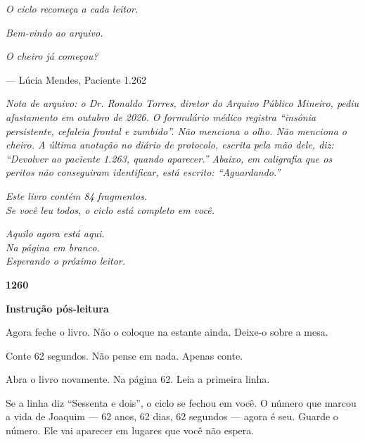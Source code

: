 \begin{center}
\vspace*{2em}
\textit{O ciclo recomeça a cada leitor.}

\vspace{2em}
\textit{Bem-vindo ao arquivo.}

\vspace{0.5em}
\textit{O cheiro já começou?}

\vspace{1.5em}
--- Lúcia Mendes, Paciente 1.262
\end{center}

\vspace{1em}
\noindent\textit{Nota de arquivo: o Dr. Ronaldo Torres, diretor do Arquivo Público Mineiro, pediu afastamento em outubro de 2026. O formulário médico registra ``insônia persistente, cefaleia frontal e zumbido''. Não menciona o olho. Não menciona o cheiro. A última anotação no diário de protocolo, escrita pela mão dele, diz: ``Devolver ao paciente 1.263, quando aparecer.'' Abaixo, em caligrafia que os peritos não conseguiram identificar, está escrito: ``Aguardando.''}

\vspace{1em}
\begin{center}
\textit{Este livro contém 84 fragmentos.}\\
\textit{Se você leu todos, o ciclo está completo em você.}

\vspace{1.5em}
\textit{Aquilo agora está aqui.}\\
\textit{Na página em branco.}\\
\textit{Esperando o próximo leitor.}

\vspace{1.5em}
\textbf{1260}
\end{center}

\vspace{2em}
\noindent\textbf{Instrução pós-leitura}

\noindent Agora feche o livro. Não o coloque na estante ainda. Deixe-o sobre a mesa.

\noindent Conte 62 segundos. Não pense em nada. Apenas conte.

\noindent Abra o livro novamente. Na página 62. Leia a primeira linha.

\noindent Se a linha diz ``Sessenta e dois'', o ciclo se fechou em você. O número que marcou a vida de Joaquim --- 62 anos, 62 dias, 62 segundos --- agora é seu. Guarde o número. Ele vai aparecer em lugares que você não espera.

